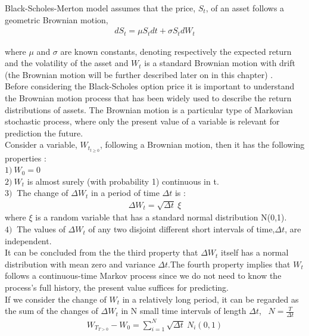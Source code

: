 \documentclass[12pt]{report}
\begin{document}
Black-Scholes-Merton model assumes that the price, $S_t$, of an asset follows a geometric Brownian motion,
\begin{gather}
dS_t = \mu S_tdt +\sigma S_tdW_t
\end{gather}

where $\mu$ and $\sigma$ are known constants, 
denoting respectively the expected return and the volatility of the asset and $W_t$ is a standard Brownian motion with drift (the Brownian motion will be further described later on in this chapter) .\\


Before considering the Black-Scholes option price it is  important to understand the Brownian motion process that has been widely used to describe the return distributions of assets. The Brownian motion is a particular type of Markovian stochastic process, where only the present value of a variable is relevant for prediction the future.\\

Consider a variable, $W_{t_{t \geqslant 0}}$,  following a Brownian motion, then it has the following properties :\\
$1)~ W_0=0 $\\
$2)~W_t$ is almost surely (with probability 1) continuous in t.\\
$3)~$ The change of $\Delta W_t$ in a  period of time $\Delta t$ is : 
\begin{gather}
\Delta W_t= \sqrt{\Delta t}~ \xi
\end{gather}
where $\xi$ is a random variable that has a standard normal distribution N(0,1).\\
$4)~$ The values of $\Delta W_t$ of any two disjoint different short intervals of time,$\Delta t$, are independent.\\ 

It can be concluded from the the third property that $\Delta W_t$ itself has a normal distribution with mean zero and variance $\Delta t$.The fourth property implies that $W_t$ follows a continuous-time Markov process since we do not need to know  the process's full history, the present value suffices for predicting.\\

If we consider the change of $W_t$ in a relatively long period, it can be regarded as the sum of the changes of $\Delta W_t$ in N small time intervals of length $\Delta t$,~ $N=\frac{T}{\Delta t}$
 \begin{gather}
W_{T_{T>0}} -W_0= \sum\limits_{i=1}^N \sqrt{\Delta t}~ N_i(0,1)
\label{broawnian}  
 \end{gather}
\end{document}
